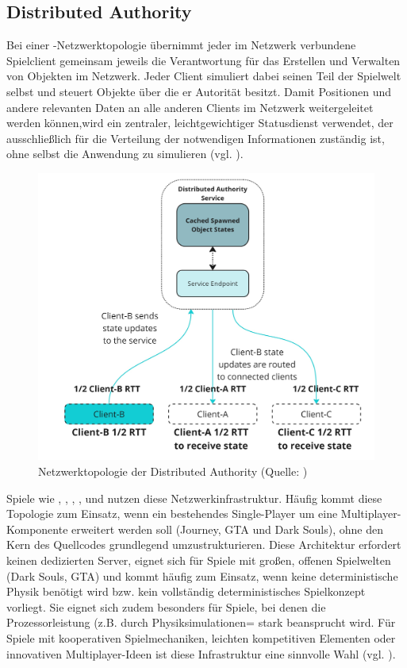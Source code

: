 \subsection{Distributed Authority}
Bei einer -Netzwerktopologie übernimmt jeder im Netzwerk verbundene Spielclient gemeinsam jeweils die Verantwortung für das Erstellen und Verwalten von Objekten im Netzwerk. Jeder Client simuliert dabei seinen Teil der Spielwelt selbst und steuert Objekte über die er Autorität besitzt.
Damit Positionen und andere relevanten Daten an alle anderen Clients im Netzwerk weitergeleitet werden können,wird ein zentraler, leichtgewichtiger Statusdienst verwendet, der ausschließlich für die Verteilung der notwendigen Informationen zuständig ist, ohne selbst die Anwendung zu simulieren (vgl. \cite{noauthor_distributed_2025}).

\begin{figure}[ht]
\centering
\includegraphics[width=1\linewidth]{content/pictures/distributed-authority-service.jpg}
\caption{Netzwerktopologie der Distributed Authority (Quelle: \cite{noauthor_distributed_2025})}
\label{fig:distributed_authority_topology}
\end{figure}

Spiele wie , , , ,  und  nutzen diese Netzwerkinfrastruktur. Häufig kommt diese Topologie zum Einsatz, wenn ein bestehendes Single-Player um eine Multiplayer-Komponente erweitert werden soll (Journey, GTA und Dark Souls), ohne den Kern des Quellcodes grundlegend umzustrukturieren. Diese Architektur erfordert keinen dedizierten Server, eignet sich für Spiele mit großen, offenen Spielwelten (Dark Souls, GTA) und kommt häufig zum Einsatz, wenn keine deterministische Physik benötigt wird bzw. kein vollständig deterministisches Spielkonzept vorliegt. Sie eignet sich zudem besonders für Spiele, bei denen die Prozessorleistung (z.B. durch Physiksimulationen= stark beansprucht wird. Für Spiele mit kooperativen Spielmechaniken, leichten kompetitiven Elementen oder innovativen Multiplayer-Ideen ist diese Infrastruktur eine sinnvolle Wahl (vgl. \cite{noauthor_choosing_2024}).

